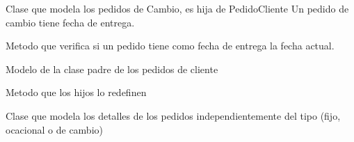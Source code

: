 \documentclass[letterpaper,10pt,english]{sphinxmanual}
\begin{document}

\begin{fulllineitems}
\label{codigo recetas:recetas.models.PedidoCambio}
Clase que modela los pedidos de Cambio, es hija de PedidoCliente
Un pedido de cambio tiene fecha de entrega.

\begin{fulllineitems}
\label{codigo recetas:recetas.models.PedidoCambio.esParaHoy}
Metodo que verifica si un pedido tiene como fecha de entrega la fecha actual.

\end{fulllineitems}


\end{fulllineitems}


\begin{fulllineitems}
\label{codigo recetas:recetas.models.PedidoCliente}
Modelo de la clase padre de los pedidos de cliente

\begin{fulllineitems}
\label{codigo recetas:recetas.models.PedidoCliente.esParaHoy}
Metodo que los hijos lo redefinen

\end{fulllineitems}


\end{fulllineitems}


\begin{fulllineitems}
\label{codigo recetas:recetas.models.PedidoClienteDetalle}
Clase que modela los detalles de los pedidos independientemente del tipo (fijo, ocacional o de cambio)

\end{fulllineitems}

\end{document}
